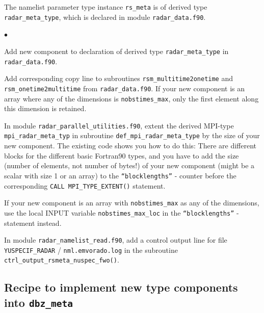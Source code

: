 \documentclass[10pt,a4paper,twoside,headinclude,footinclude,parskip=half]{scrartcl}
\newcommand{\myaktuellesection}{sec:intro}%
\newcommand{\labelsec}[1]{\label{#1}\renewcommand{\myaktuellesection}{#1}}%
\newcommand{\labelsec}[1]{\label{#1}}%
\newlength{\tmplena}%
\newenvironment{aufzaehlung}%
{\begin{list}{$\bullet$}{%
      \setlength{\labelwidth}{8mm}%
      \setlength{\leftmargin}{\labelwidth*\real{0.5}}%
      \setlength{\tmplena}{\itemsep}%
      \setlength{\itemsep}{0mm}%
}}{\setlength{\itemsep}{\tmplena}\end{list}}%
\newcommand{\srcform}[1]{\mbox{\texttt{#1}}\xspace}%
\begin{document}
The namelist parameter type instance \srcform{rs_meta} is of derived type \srcform{radar_meta_type}, which
is declared in module \srcform{radar_data.f90}.
\begin{aufzaehlung}
\item Add new component to declaration of derived type \srcform{radar_meta_type} in \srcform{radar_data.f90}.
\item Add corresponding copy line to subroutines \srcform{rsm_multitime2onetime} and \srcform{rsm_onetime2multitime} from \srcform{radar_data.f90}.
If your new component is an array where any of the dimensions is \srcform{nobstimes_max}, only the first element 
along this dimension is retained.
\item In module \srcform{radar_parallel_utilities.f90}, extent the derived MPI-type \srcform{mpi_radar_meta_typ}
in subroutine \srcform{def_mpi_radar_meta_type} by the size of your new component.
The existing code shows you how to do this: There are different blocks for the different
basic Fortran90 types, and you have to add the size (number of elements, not number of bytes!) of
your new component (might be a scalar with size 1 or an array) to the
\srcform{``blocklengths''} - counter before the corresponding \srcform{CALL MPI_TYPE_EXTENT()} statement.
\item If your new component is an array with \srcform{nobstimes_max} as any of the dimensions, use the local INPUT variable
\srcform{nobstimes_max_loc} in the \srcform{``blocklengths''} - statement instead.
\item In module \srcform{radar_namelist_read.f90}, add a control output line for file \srcform{YUSPECIF_RADAR} / \srcform{nml.emvorado.log} in the
subroutine \srcform{ctrl_output_rsmeta_nuspec_fwo()}.
\end{aufzaehlung}

\subsection{Recipe to implement new type components into \srcform{dbz_meta}}

\labelsec{sec:devel:newtypedbz}
\end{document}
